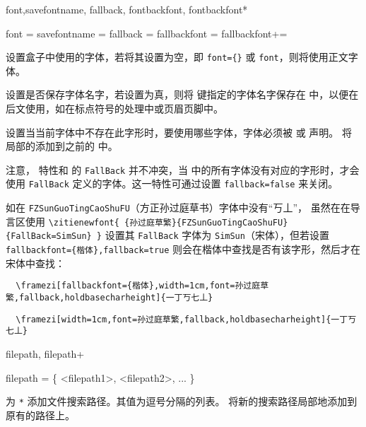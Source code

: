 \documentclass{ctxdoc}
\begin{document}
\begin{function}{
  font,savefontname,
  fallback,
  fontbackfont,
  fontbackfont*
}
  \begin{syntax}
    font =  
    savefontname = \TTF {}
    fallback = \TTF {}
    fallbackfont = 
    fallbackfont+= 
  \end{syntax}
   设置盒子中使用的字体，若将其设置为空，即 \verb|font={}| 或 \verb|font|，则将使用正文字体。

   设置是否保存字体名字，若设置为真，则将  键指定的字体名字保存在  中，以便在后文使用，如在标点符号的处理中或页眉页脚中。

   设置当当前字体中不存在此字形时，要使用哪些字体，字体必须被  或  声明。
   将  局部的添加到之前的  中。

  注意， 特性和  的 \verb|FallBack| 并不冲突，当  中的所有字体没有对应的字形时，才会使用 \verb|FallBack| 定义的字体。这一特性可通过设置 \verb|fallback=false| 来关闭。
\end{function}

如在 \verb|FZSunGuoTingCaoShuFU|（方正孙过庭草书）字体中没有“丂丄”，
虽然在在导言区使用 \verb|\zitienewfont{ {孙过庭草繁}{FZSunGuoTingCaoShuFU}{FallBack=SimSun} }| 设置其 \verb|FallBack| 字体为 \verb|SimSun|（宋体），但若设置 \verb|fallbackfont={楷体},fallback=true| 则会在楷体中查找是否有该字形，然后才在宋体中查找：

\begin{verbatim}
  \framezi[fallbackfont={楷体},width=1cm,font=孙过庭草繁,fallback,holdbasecharheight]{一丁丂七丄}
\end{verbatim}

\begin{verbatim}
  \framezi[width=1cm,font=孙过庭草繁,fallback,holdbasecharheight]{一丁丂七丄}
\end{verbatim}

\begin{function}{
  filepath,
  filepath+
}
  \begin{syntax}
    filepath = \{ <filepath1>, <filepath2>, ... \}
  \end{syntax}
   为 \verb|*| 添加文件搜索路径。其值为逗号分隔的列表。
   将新的搜索路径局部地添加到原有的路径上。
\end{function}
\end{document}
